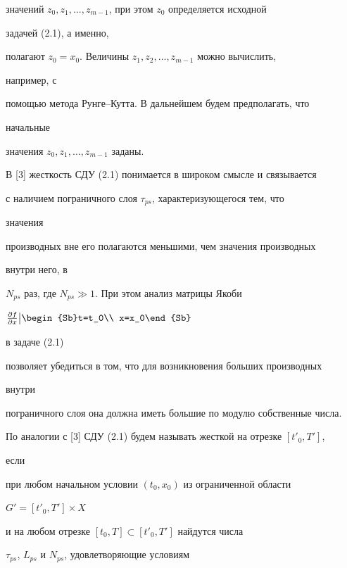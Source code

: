значений $z_0,z_1,...,z_{m{-}1}$, при этом $z_0$ определяется исходной 




задачей (2.1), а именно, 


полагают $z_0=x_0$. Величины $z_1,z_2,\dotsc,z_{m-1}$ можно вычислить, 


например, с 


помощью метода Рунге--Кутта. В дальнейшем будем предполагать, что 


начальные 


значения $z_0,z_1,\dotsc,z_{m-1}$ заданы. 


 


В [3] жесткость СДУ (2.1) понимается в широком смысле и связывается 


с наличием пограничного слоя $\tau_{ps}$, характеризующегося тем, что 


значения 


производных вне его полагаются меньшими, чем значения производных 


внутри него, в 


$N_{ps}$ раз, где $N_{ps}\gg1$. При этом анализ матрицы Якоби 


$\frac{\partial f}{\partial x}\big|\begin{Sb}t=t_0\\ x=x_0\end{Sb}$ 


в задаче (2.1) 


позволяет убедиться в том, что для возникновения больших производных 


внутри 


пограничного слоя она должна иметь большие по модулю собственные числа. 


 


По аналогии с [3] СДУ (2.1) будем называть жесткой на отрезке $[t'_0,T']$, 


если 


при любом начальном условии $(t_0,x_0)$ из ограниченной области 


$G'=[t'_0,T']\times X$ 


и на любом отрезке $[t_0,T]\subset[t'_0,T']$ найдутся числа 


$\tau_{ps}$, $L_{ps}$ и $N_{ps}$, удовлетворяющие условиям 


